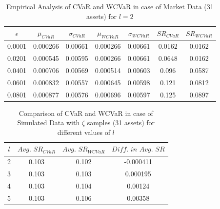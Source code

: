 \documentclass[12pt]{article}
\numberwithin{equation}{section}
\begin{document}
\begin{table}[!h]
\centering
\captionsetup{justification=centering}
\begin{tabular}{||c|c|c|c|c|c|c||}
\hline
$\epsilon$ & $\mu_{CVaR}$ & $\sigma_{CVaR}$ & $\mu_{WCVaR}$ & $\sigma_{WCVaR}$ & $SR_{CVaR}$ & $SR_{WCVaR}$\\
\hline
0.0001 & 0.000266 & 0.00661 & 0.000266 & 0.00661 & 0.0162 & 0.0162 \\
0.0201 & 0.000545 & 0.00595 & 0.000266 & 0.00661 & 0.0648 & 0.0162 \\
0.0401 & 0.000706 & 0.00569 & 0.000514 & 0.00603 & 0.096 & 0.0587 \\
0.0601 & 0.000832 & 0.00557 & 0.000645 & 0.00598 & 0.121 & 0.0812 \\
0.0801 & 0.000877 & 0.00576 & 0.000696 & 0.00597 & 0.125 & 0.0897 \\
\hline
\end{tabular}
\caption{Empirical Analysis of CVaR and WCVaR in case of Market Data (31 assets) for $l=2$}
\label{tab:6.1}
\end{table}

\begin{table}[!h]
\centering
\captionsetup{justification=centering}
\begin{tabular}{||c|c|c|c||}
\hline
$l$ & $Avg. \, \, SR_{CVaR}$ & $Avg. \, \, SR_{WCVaR}$ & $Diff. \, \, in \, \, Avg. \, \, SR$ \\
\hline
2 & 0.103 & 0.102 & -0.000411 \\
3 & 0.103 & 0.103 & 0.000195 \\
4 & 0.103 & 0.104 & 0.00124 \\
5 & 0.103 & 0.106 & 0.00358 \\
\hline
\end{tabular}
\caption{Comparison of CVaR and WCVaR in case of Simulated Data with $\zeta$ samples (31 assets) for different values of $l$}
\label{avgtab:6.2}
\end{table}

\clearpage
\newpage
\end{document}
